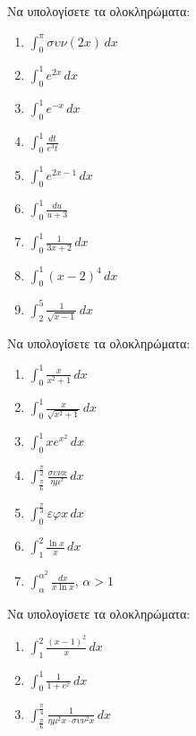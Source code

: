 \documentclass{presentation}
\begin{document}
\begin{askisi}
    Να υπολογίσετε τα ολοκληρώματα:
    \begin{enumerate}[<+->]
        \item $\int_{0}^{π}συν(2x)\,dx$
        \item $\int_{0}^{1}e^{2x}\,dx$
        \item $\int_{0}^{1}e^{-x}\,dx$
        \item $\int_{0}^{1}\frac{dt}{e^3t}$
        \item $\int_{0}^{1}e^{2x-1}\,dx$
        \item $\int_{0}^{1}\frac{du}{u+3}$
        \item $\int_{0}^{1}\frac{1}{3x+2}\,dx$
        \item $\int_{0}^{1}(x-2)^4\,dx$
        \item $\int_{2}^{5}\frac{1}{\sqrt{x-1}}\,dx$
    \end{enumerate}
\end{askisi}

\begin{askisi}
    Να υπολογίσετε τα ολοκληρώματα:
    \begin{enumerate}[<+->]
        \item $\int_{0}^{1}\frac{x}{x^2+1}\,dx$
        \item $\int_{0}^{1}\frac{x}{\sqrt{x^2+1}}\,dx$
        \item $\int_{0}^{1}xe^{x^2}\,dx$
        \item $\int_{\frac{π}{6}}^{\frac{π}{2}}\frac{συνx}{ημ^x}\, dx$
        \item $\int_{0}^{\frac{π}{3}}εφx\,dx$
        \item $\int_{1}^{2}\frac{\ln x}{x}\, dx$
        \item $\int_{α}^{α^2}\frac{dx}{x\ln x}$, $α>1$
    \end{enumerate}
\end{askisi}

\begin{askisi}
    Να υπολογίσετε τα ολοκληρώματα:
    \begin{enumerate}[<+->]
        \item $\int_{1}^{2}\frac{(x-1)^2}{x}\, dx$
        \item $\int_{0}^{1}\frac{1}{1+e^x}\, dx$
        \item $\int_{\frac{π}{6}}^{\frac{π}{4}}\frac{1}{ημ^2x\cdot συν^2x}\, dx$
    \end{enumerate}
\end{askisi}
\end{document}
